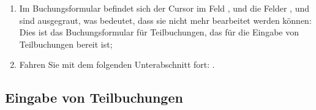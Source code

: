 \begin{enumerate}
	\item Im Buchungsformular befindet sich der Cursor im Feld , und die Felder ,  und  sind ausgegraut, was bedeutet, dass sie nicht mehr bearbeitet werden können: Dies ist das Buchungsformular für Teilbuchungen, das für die Eingabe von Teilbuchungen bereit ist;
	\item Fahren Sie mit dem folgenden Unterabschnitt fort: .
\end{enumerate}


\subsection{Eingabe von Teilbuchungen\label{transactions-breakdown-slave}}

